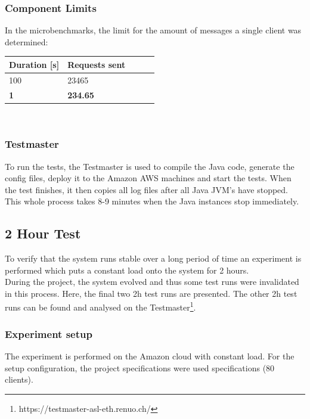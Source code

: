 \documentclass[milestone1.tex]{subfiles}
\begin{document}
\subsubsection{Component Limits}

In the microbenchmarks, the limit for the amount of messages a single client was determined:\\

\begin{tabular}{|l|l|r|r|r|}
\hline
\textbf{Duration [s]} & \textbf{Requests sent} \\ \hline
100 & 23465 \\ \hline
\textbf{1} & \textbf{234.65} \\ \hline
\end{tabular}
\\





\subsubsection{Testmaster}

To run the tests, the Testmaster is used to compile the Java code, generate the config files, deploy it to the Amazon AWS machines and start the tests. When the test finishes, it then copies all log files after all Java JVM's have stopped. This whole process takes 8-9 minutes when the Java instances stop immediately.




\subsection{2 Hour Test}



To verify that the system runs stable over a long period of time an experiment is performed which puts a constant load onto the system for 2 hours.\\

During the project, the system evolved and thus some test runs were invalidated in this process. Here, the final two 2h test runs are presented. The other 2h test runs can be found and analysed on the Testmaster\footnote{https://testmaster-asl-eth.renuo.ch/}.\\

\subsubsection{Experiment setup}
The experiment is performed on the Amazon cloud with constant load. For the setup configuration, the project specifications were used specifications (80 clients).\\
\end{document}
